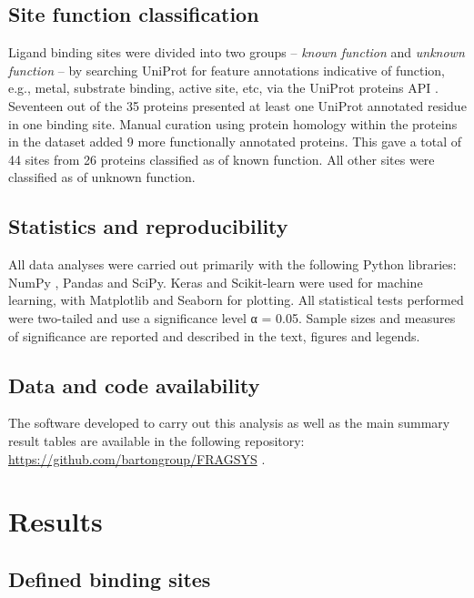 {\subsection{Site function classification}

Ligand binding sites were divided into two groups -- \textit{known function} and \textit{unknown function} -- by searching UniProt \cite{UNIPROT_2019_UNIPROT} for feature annotations indicative of function, e.g., metal, substrate binding, active site, etc, via the UniProt proteins API \cite{NIGHTINGALE_2017_API}. Seventeen out of the 35 proteins presented at least one UniProt annotated residue in one binding site. Manual curation using protein homology within the proteins in the dataset added 9 more functionally annotated proteins. This gave a total of 44 sites from 26 proteins classified as of known function. All other sites were classified as of unknown function.

\subsection{Statistics and reproducibility}

All data analyses were carried out primarily with the following Python libraries: NumPy \cite{HARRIS_2020_NUMPY}, Pandas \cite{MCKINNEY_2010_PANDAS,PANDAS_2022_PANDAS} and SciPy. Keras and Scikit-learn were used for machine learning, with Matplotlib \cite{HUNTER_2007_MATPLOTLIB} and Seaborn \cite{WASKOM_2021_SEABORN} for plotting. All statistical tests performed were two-tailed and use a significance level α = 0.05. Sample sizes and measures of significance are reported and described in the text, figures and legends.

\subsection{Data and code availability}

The software developed to carry out this analysis as well as the main summary result tables are available in the following repository: \url{https://github.com/bartongroup/FRAGSYS} \cite{UTGES_2024_FRAGSYS_ZENODO}.

\section{Results}

\subsection{Defined binding sites}

}
